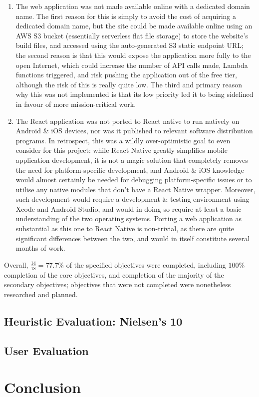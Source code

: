 \documentclass[a4paper,11pt]{report}
\begin{document}
\begin{enumerate}
    \item   The web application was not made available online with a dedicated domain name.
            The first reason for this is simply to avoid the cost of acquiring a dedicated domain name, but the site could be made available online using an AWS S3 bucket\supercite{s3} (essentially serverless flat file storage) to store the website's build files, and accessed using the auto-generated S3 static endpoint URL;
            the second reason is that this would expose the application more fully to the open Internet, which could increase the number of API calls made, Lambda functions triggered, and risk pushing the application out of the free tier, although the risk of this is really quite low.
            The third and primary reason why this was not implemented is that its low priority led it to being sidelined in favour of more mission-critical work.

    \item   The React application was not ported to React native to run natively on Android \& iOS devices, nor was it published to relevant software distribution programs.
            In retrospect, this was a wildly over-optimistic goal to even consider for this project:
            while React Native greatly simplifies mobile application development, it is not a magic solution that completely removes the need for platform-specific development, and Android \& iOS knowledge would almost certainly be needed for debugging platform-specific issues or to utilise any native modules that don't have a React Native wrapper.
            Moreover, such development would require a development \& testing environment using Xcode and Android Studio, and would in doing so require at least a basic understanding of the two operating systems.
            Porting a web application as substantial as this one to React Native is non-trivial, as there are quite significant differences between the two, and would in itself constitute several months of work.
\end{enumerate}

Overall, $\frac{14}{18} = 77.\dot{7} \%$ of the specified objectives were completed, including $100\%$ completion of the core objectives, and completion of the majority of the secondary objectives;
objectives that were not completed were nonetheless researched and planned.

\section{Heuristic Evaluation: Nielsen's 10}
\section{User Evaluation}

\chapter{Conclusion}









\printbibliography
\end{document}
